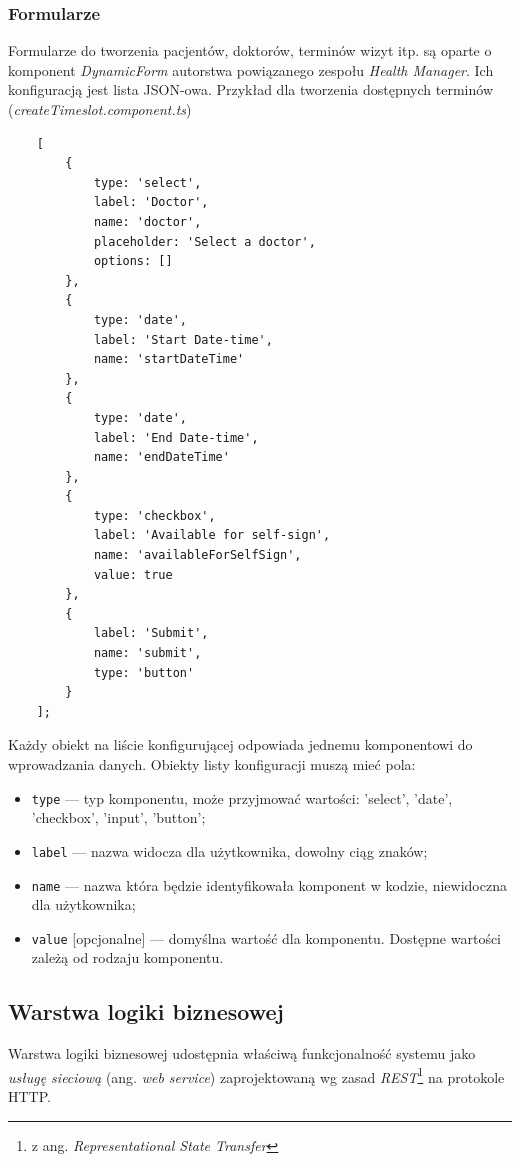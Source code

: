 \documentclass[polish,12pt]{aghthesis}
\begin{document}
\subsubsection{Formularze}
Formularze do tworzenia pacjentów, doktorów, terminów wizyt itp. są oparte o komponent \emph{DynamicForm} autorstwa powiązanego zespołu \emph{Health Manager}.
Ich konfiguracją jest lista JSON-owa. Przykład dla tworzenia dostępnych terminów (\emph{createTimeslot.component.ts})
\begin{verbatim}
    [
        {
            type: 'select',
            label: 'Doctor',
            name: 'doctor',
            placeholder: 'Select a doctor',
            options: []
        },
        {
            type: 'date',
            label: 'Start Date-time',
            name: 'startDateTime'
        },
        {
            type: 'date',
            label: 'End Date-time',
            name: 'endDateTime'
        },
        {
            type: 'checkbox',
            label: 'Available for self-sign',
            name: 'availableForSelfSign',
            value: true
        },
        {
            label: 'Submit',
            name: 'submit',
            type: 'button'
        }
    ];
\end{verbatim}
Każdy obiekt na liście konfigurującej odpowiada jednemu komponentowi do wprowadzania danych. Obiekty listy konfiguracji muszą mieć pola:
\begin{itemize}
    \item \texttt{type} --- typ komponentu, może przyjmować wartości: 'select', 'date', 'checkbox', 'input', 'button';
    \item \texttt{label} --- nazwa widocza dla użytkownika, dowolny ciąg znaków;
    \item \texttt{name} --- nazwa która będzie identyfikowała komponent w kodzie, niewidoczna dla użytkownika;
    \item \texttt{value} [opcjonalne] --- domyślna wartość dla komponentu. Dostępne wartości zależą od rodzaju komponentu.
\end{itemize}


\subsection{Warstwa logiki biznesowej}
Warstwa logiki biznesowej udostępnia właściwą funkcjonalność systemu jako \emph{usługę sieciową} (ang. \emph{web service}) zaprojektowaną wg zasad \emph{REST}\footnote{z ang. \emph{Representational State Transfer}} na protokole HTTP.
\end{document}

